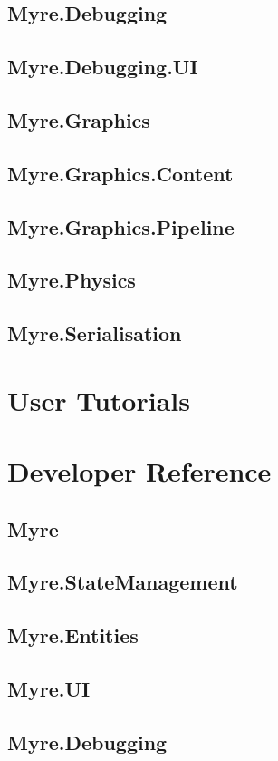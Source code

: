 \documentclass{article}
\begin{document}
\subsection{Myre.Debugging}
\subsection{Myre.Debugging.UI}
\subsection{Myre.Graphics}
\subsection{Myre.Graphics.Content}
\subsection{Myre.Graphics.Pipeline}
\subsection{Myre.Physics}
\subsection{Myre.Serialisation}

\section{User Tutorials}

\section{Developer Reference}
\subsection{Myre}
\subsection{Myre.StateManagement}
\subsection{Myre.Entities}
\subsection{Myre.UI}
\subsection{Myre.Debugging}
\end{document}
